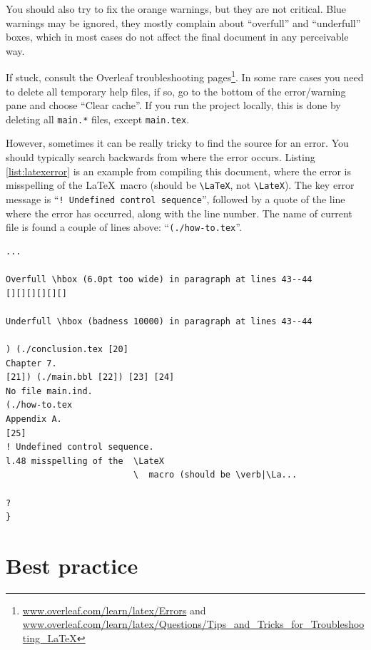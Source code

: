 You should also try to fix the orange warnings, but they are not critical. Blue warnings may be ignored, they mostly complain about ``overfull'' and ``underfull'' boxes, which in most cases do not affect the final document in any perceivable way.

If stuck, consult the Overleaf troubleshooting pages\footnote{\url{www.overleaf.com/learn/latex/Errors} and
\url{www.overleaf.com/learn/latex/Questions/Tips_and_Tricks_for_Troubleshooting_LaTeX}}. In some rare cases you need to delete all temporary help files, if so, go to the bottom of the error/warning pane and choose ``Clear cache''. If you run the project locally, this is done by deleting all \texttt{main.*} files, except \texttt{main.tex}.

However, sometimes it can be really tricky to find the source for an error. You should typically search backwards from where the error occurs. Listing \ref{list:latexerror} is an example from compiling this document, where the error is 
misspelling of the \LaTeX\  macro (should be \verb|\LaTeX|, not \verb|\LateX|). The key error message is ``\verb|! Undefined control sequence|'', followed by a quote of the line where the error has occurred, along with the line number. The name of current file is found a couple of lines above: ``\verb|(./how-to.tex|''.

\begin{lstlisting}[float=htpb, caption=\LaTeX\ error output,label=list:latexerror]
...

Overfull \hbox (6.0pt too wide) in paragraph at lines 43--44
[][][][][][]

Underfull \hbox (badness 10000) in paragraph at lines 43--44

) (./conclusion.tex [20]
Chapter 7.
[21]) (./main.bbl [22]) [23] [24]
No file main.ind.
(./how-to.tex
Appendix A.
[25]
! Undefined control sequence.
l.48 misspelling of the  \LateX
                         \  macro (should be \verb|\La...

? 
} 
\end{lstlisting} 



\section{Best practice}
\label{sec:bestpractise}

